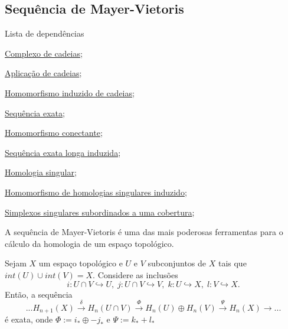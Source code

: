 \subsection{Sequência de Mayer-Vietoris} %
\label{sequencia-de-mayer-vietoris-prop}
\begin{titlemize}{Lista de dependências}
	\item \hyperref[complexo-de-cadeias-def]{Complexo de cadeias};\\ 
    \item \hyperref[aplicacao-de-cadeias-def]{Aplicação de cadeias};\\
    \item \hyperref[homomorfismo-induzido-de-cadeias-prop]{Homomorfismo induzido de cadeias};\\
    \item \hyperref[sequencia-exata-def]{Sequência exata};\\
    \item \hyperref[homomorfismo-conectante-def]{Homomorfismo conectante};\\
    \item \hyperref[sequencia-exata-longa-induzida-prop]{Sequência exata longa induzida};\\
    \item \hyperref[homologia-singular-def]{Homologia singular};\\
    \item \hyperref[homomorfismo-de-homologias-singulares-induzido-prop]{Homomorfismo de homologias singulares induzido};\\
    \item \hyperref[simplexos-singulares-subordinados-a-uma-cobertura-def]{Simplexos singulares subordinados a uma cobertura};\\
    
\end{titlemize}

A sequência de Mayer-Vietoris é uma das mais poderosas ferramentas para o cálculo da homologia de um espaço topológico.
\begin{thm}
    Sejam $X$ um espaço topológico e $U$ e $V$ subconjuntos de $X$ tais que $int(U)\cup int(V)=X$. Considere as inclusões 
    \[i:U\cap V\hookrightarrow U,\;j:U\cap V\hookrightarrow V,\;k:U\hookrightarrow X,\;l:V\hookrightarrow X.\]
    Então, a sequência 
    \[...H_{n+1}(X)\xrightarrow{\delta} H_n(U\cap V)\xrightarrow{\Phi}H_n(U)\oplus H_n(V)\xrightarrow{\Psi} H_n(X)\rightarrow ...\]
    é exata, onde $\Phi:=i_*\oplus-j_*$ e $\Psi:=k_*+l_*$ 
\end{thm}

